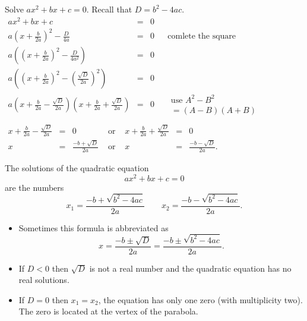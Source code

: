 \begin{frame}
\begin{problem}
Solve $ax^2+bx+c=0$. Recall that $D=b^2-4ac$.
$
\begin{array}{rcll|l}
\displaystyle ax^2+bx+c&=&0 \\
\displaystyle a\left(x +\frac{b }{2a}  \right)^2- \frac{D}{4a}&=& 0&&\text{comlete the square}\\
\displaystyle a\left(\left(x +\frac{b }{2a} \right)^2- \frac{D}{4a^2}\right)&=& 0\\
\displaystyle a\left(\left(x +\frac{b }{2a} \right)^2- \left( \frac{ \sqrt{D }}{2 a}\right)^2\right)&=& 0\\
\displaystyle a\left(x+\frac{b }{2a}-\frac{\sqrt{D}}{2a} \right)\left(x+\frac{b }{2a}+\frac{\sqrt{D}}{2a} \right)&=&0 &&\begin{array}{l} \text{use } A^2-B^2\\ =(A-B)(A+B)\end{array} \\
\end{array}
$
$
\begin{array}{rclcrcl}
\displaystyle x+\frac{b}{2a}-\frac{\sqrt{D}}{2a}&=&0 &\text{ or } & \displaystyle x+\frac{b}{2a}+\frac{\sqrt{D}}{2a}&=&0\\
x&=&\displaystyle \frac{-b+\sqrt{D}}{2a} & \text{ or } & x&=&\displaystyle \frac{-b-\sqrt{D}}{2a}.
\end{array}
$
\end{problem}
\end{frame}
\begin{frame}
\begin{theorem}
The solutions of the quadratic equation 
\[
ax^2+bx+c=0
\]
are the numbers 
\[
x_1=\frac{-b+ \sqrt{b^2-4ac}}{2a} \qquad x_2=\frac{-b- \sqrt{b^2-4ac}}{2a}.
\]
\end{theorem}
\begin{itemize}
\item Sometimes this formula is abbreviated as 
\[
x=\frac{-b\pm \sqrt{D}}{2a}=\frac{-b\pm \sqrt{b^2-4ac}}{2a}.
\]
\item If $D<0$ then $\sqrt{D}$ is not a real number and the quadratic equation has no real solutions.
\item If $D=0$ then $x_1=x_2$, the equation has only one zero (with multiplicity two). The zero is located at the vertex of the parabola.
\end{itemize}
\end{frame}